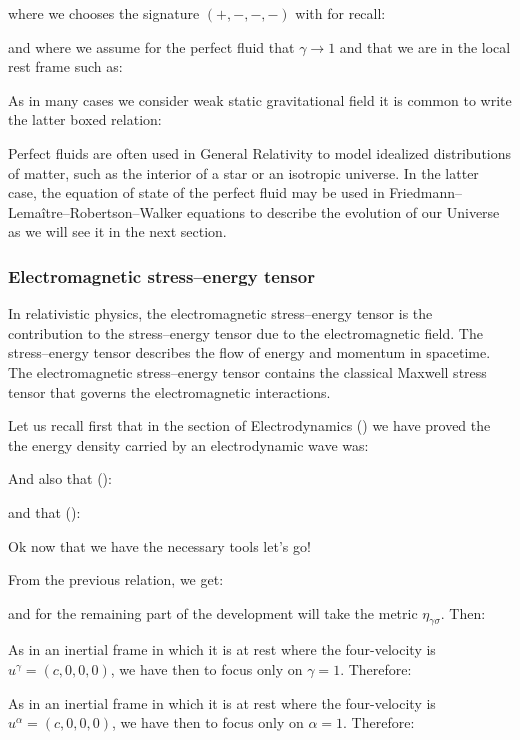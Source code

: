 	where we chooses the signature $(+, -, -, -)$ with for recall:
	
	and where we assume for the perfect fluid that $\gamma\rightarrow 1$ and that we are in the local rest frame such as:
	
	As in many cases we consider weak static gravitational field it is common to write the latter boxed relation:
	
	Perfect fluids are often used in General Relativity to model idealized distributions of matter, such as the interior of a star or an isotropic universe. In the latter case, the equation of state of the perfect fluid may be used in Friedmann–Lemaître–Robertson–Walker equations to describe the evolution of our Universe as we will see it in the next section.
	
	\subsubsection{Electromagnetic stress–energy tensor}
	In relativistic physics, the electromagnetic stress–energy tensor is the contribution to the stress–energy tensor due to the electromagnetic field. The stress–energy tensor describes the flow of energy and momentum in spacetime. The electromagnetic stress–energy tensor contains the classical Maxwell stress tensor that governs the electromagnetic interactions.
	
	Let us recall first that in the section of Electrodynamics () we have proved the the energy density carried by an electrodynamic wave was:
	
	And also that ():
	
	and that ():
	
	Ok now that we have the necessary tools let's go!
	
	From the previous relation, we get:
	
	and for the remaining part of the development will take the metric $\eta_{\gamma\sigma}$. Then:
	
	As in an inertial frame in which it is at rest where the four-velocity is $u^\gamma=(c, 0, 0, 0)$, we have then to focus only on $\gamma=1$. Therefore:
	
	As in an inertial frame in which it is at rest where the four-velocity is $u^\alpha=(c, 0, 0, 0)$, we have then to focus only on $\alpha=1$. Therefore:
	

